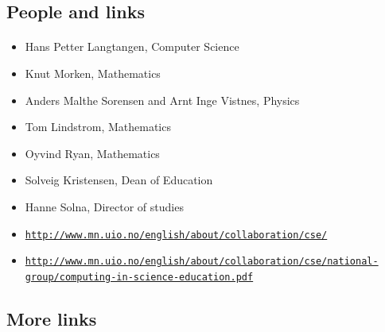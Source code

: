 \documentclass[%
twoside,                 %
final,                   %
10pt]{article}
\begin{document}
\noindent




\subsection*{People and links}

\paragraph{}
\begin{itemize}
\item Hans Petter Langtangen, Computer Science

\item Knut Morken, Mathematics

\item Anders Malthe Sorensen and Arnt Inge Vistnes, Physics

\item Tom Lindstrom, Mathematics

\item Oyvind Ryan, Mathematics

\item Solveig Kristensen, Dean of Education

\item Hanne Solna, Director of studies

\item \href{{http://www.mn.uio.no/english/about/collaboration/cse/}}{\nolinkurl{http://www.mn.uio.no/english/about/collaboration/cse/}}

\item \href{{http://www.mn.uio.no/english/about/collaboration/cse/national-group/computing-in-science-education.pdf}}{\nolinkurl{http://www.mn.uio.no/english/about/collaboration/cse/national-group/computing-in-science-education.pdf}}
\end{itemize}

\noindent




\subsection*{More links}

\end{document}
